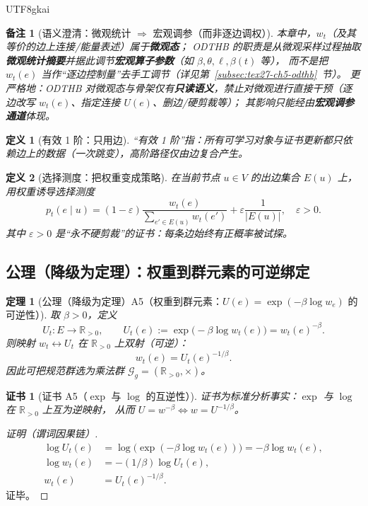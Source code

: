 \documentclass[12pt]{article}
\newtheorem{definition}{定义}[section]
\newtheorem{theorem}{定理}[section]
\newtheorem{remark}{备注}[section]
\newtheorem{Certificate}{证书}[section]
\newcommand{\RR}{\mathbb{R}}
\begin{document}
\begin{CJK*}{UTF8}{gkai}
\begin{remark}[语义澄清：微观统计 $\Rightarrow$ 宏观调参（而非逐边调权）]
本章中，$w_t$（及其等价的边上连接/能量表述）属于\textbf{微观态}；
ODTHB 的职责是从微观采样过程抽取\textbf{微观统计摘要}并据此调节\textbf{宏观算子参数}（如 $\beta,\theta,\ell,\beta(t)$ 等），
而不是把 $w_t(e)$ 当作“逐边控制量”去手工调节（详见第~\ref{subsec:tex27-ch5-odthb}~节）。
更严格地：ODTHB 对微观态与骨架仅有\textbf{只读语义}，禁止对微观进行直接干预（逐边改写 $w_t(e)$、指定连接 $U(e)$、删边/硬剪裁等）；
其影响只能经由\textbf{宏观调参通道}体现。
\end{remark}

\begin{definition}[有效 1 阶：只用边]
\label{def:tex27-ch5-d2}
“有效 1 阶”指：所有可学习对象与证书更新都只依赖边上的数据（一次跳变），高阶路径仅由边复合产生。
\end{definition}

\begin{definition}[选择测度：把权重变成策略]
\label{def:tex27-ch5-d3}
在当前节点 $u\in V$ 的出边集合 $E(u)$ 上，用权重诱导选择测度
\[
  p_t(e\mid u)= (1-\varepsilon)\frac{w_t(e)}{\sum_{e'\in E(u)}w_t(e')}+\varepsilon\frac{1}{|E(u)|},\quad \varepsilon>0.
\]
其中 $\varepsilon>0$ 是“永不硬剪裁”的证书：每条边始终有正概率被试探。
\end{definition}

\subsection{公理（降级为定理）：权重到群元素的可逆绑定}
\label{subsec:tex27-ch5-axiom}

\begin{theorem}[公理（降级为定理）A5（权重到群元素：$U(e)=\exp(-\beta\log w_e)$ 的可逆性）]
\label{thm:tex27-ch5-a5}
取 $\beta>0$，定义
\[
  U_t:E\to \RR_{>0},\qquad U_t(e):=\exp\!\bigl(-\beta\log w_t(e)\bigr)=w_t(e)^{-\beta}.
\]
则映射 $w_t\leftrightarrow U_t$ 在 $\RR_{>0}$ 上双射（可逆）：
\[
  w_t(e)=U_t(e)^{-1/\beta}.
\]
因此可把规范群选为乘法群 $\mathcal{G}_g=(\RR_{>0},\times)$。
\end{theorem}

\begin{Certificate}[证书 A5（$\exp$ 与 $\log$ 的互逆性）]
\label{cert:tex27-ch5-a5}
证书为标准分析事实：$\exp$ 与 $\log$ 在 $\RR_{>0}$ 上互为逆映射，
从而 $U=w^{-\beta}\Leftrightarrow w=U^{-1/\beta}$。
\end{Certificate}

\begin{proof}[证明（谓词因果链）]
\[
\begin{aligned}
  \log U_t(e)
  &=\log\!\bigl(\exp(-\beta\log w_t(e))\bigr)
  =-\beta\log w_t(e),\\
  \log w_t(e)&=-(1/\beta)\log U_t(e),\\
  w_t(e)&=U_t(e)^{-1/\beta}.
\end{aligned}
\]
证毕。
\end{proof}


\end{CJK*}
\end{document}
